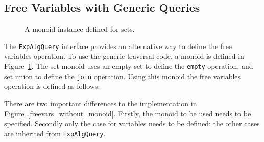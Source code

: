 \begin{comment}
And now we find everything goes in an easier way: we don't care about
what kind of query it is any more during the traversal. Despite
whether it asks for all the names of free variables or a printer
showing the hierarchy of an expression, at first we can simply
override the method \lstinline{m()}, which provides an instance of
\lstinline{Monoid}, in the return statement. As the next step, we only
need to override a few other methods to meet the requirements. This is
the progress, once we have such a template dealing with the traversal,
all query algebras can be addressed in a more concise way, which is
called the \textit{generic query algebra}.
\end{comment}

\subsection{Free Variables with Generic Queries}\label{subsec:solvingfreevars}

\begin{figure}[t]
\vspace{-.1in}
\caption{A monoid instance defined for sets.}
\label{freevars_monoid}
\end{figure}

The \lstinline{ExpAlgQuery} interface provides an alternative way to
define the free variables operation. To use the generic traversal
code, a monoid is defined in Figure~\ref{freevars_monoid}. The set monoid 
uses an empty set to define the \lstinline{empty} operation, and set 
union to define the \lstinline{join} operation. Using this monoid 
the free variables operation is defined as follows:



There are two important differences to the implementation in
Figure~\ref{freevars_without_monoid}.  Firstly, the monoid to be used
needs to be specified.  Secondly only the case for variables needs to
be defined: the other cases are inherited from
\lstinline{ExpAlgQuery}. 

